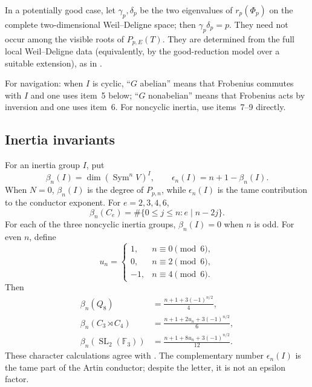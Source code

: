 \documentclass[11pt,reqno]{amsart}
\theoremstyle{definition}
\theoremstyle{remark}
\newcommand{\SL}{\operatorname{SL}}
\newcommand{\Sym}{\operatorname{Sym}}
\begin{document}
In a potentially good case, let $\gamma_p,\delta_p$ be the two eigenvalues of
$r_p(\Phi_p)$ on the complete two-dimensional Weil--Deligne space; then
$\gamma_p\delta_p=p$.  They need not occur among the visible roots of
$P_{p,E}(T)$.  They are determined from the full local Weil--Deligne data (equivalently,
by the good-reduction model over a suitable extension), as in
\cite[Proposition~5.1]{DMW}.

For navigation: when $I$ is cyclic, ``$G$ abelian'' means that Frobenius
commutes with $I$ and one uses item~5 below; ``$G$ nonabelian'' means that
Frobenius acts by inversion and one uses item~6.  For noncyclic inertia, use
items~7--9 directly.

\subsection{Inertia invariants}

For an inertia group $I$, put
\begin{equation}\label{eq:beta-epsilon}
 \beta_n(I)=\dim(\Sym^nV)^I,
 \qquad
 \epsilon_n(I)=n+1-\beta_n(I).
\end{equation}
When $N=0$, $\beta_n(I)$ is the degree of $P_{p,n}$, while
$\epsilon_n(I)$ is the tame contribution to the conductor exponent.
For $e=2,3,4,6$,
\begin{equation}\label{eq:beta-cyclic}
 \beta_n(C_e)=
 \#\{0\leq j\leq n:e\mid n-2j\}.
\end{equation}
For each of the three noncyclic inertia groups, $\beta_n(I)=0$ when $n$ is
odd.  For even $n$, define
\begin{equation*}
 u_n=
 \begin{cases}
 1,&n\equiv0\pmod6,\\
 0,&n\equiv2\pmod6,\\
 -1,&n\equiv4\pmod6.
 \end{cases}
\end{equation*}
Then
\begin{align}
 \beta_n(Q_8)
 &=\frac{n+1+3(-1)^{n/2}}4,\label{eq:beta-Q8}\\
 \beta_n(C_3\rtimes C_4)
 &=\frac{n+1+2u_n+3(-1)^{n/2}}6,\label{eq:beta-G24}\\
 \beta_n(\SL_2(\mathbb F_3))
 &=\frac{n+1+8u_n+3(-1)^{n/2}}{12}.
 \label{eq:beta-SL2}
\end{align}
These character calculations agree with
\cite[Table~1]{MartinWatkins}.  The complementary number
$\epsilon_n(I)$ is the tame part of the Artin conductor; despite the letter,
it is not an epsilon factor.
\end{document}
